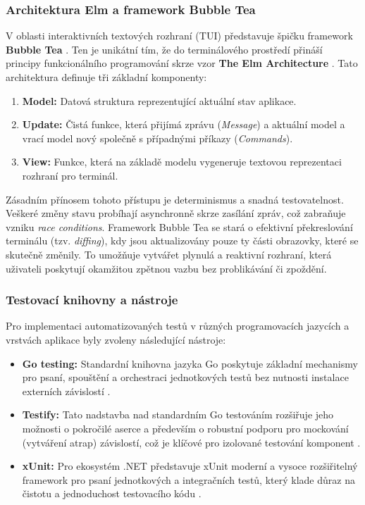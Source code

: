 \subsubsection{Architektura Elm a framework Bubble Tea}
\label{sec:elm_bubbletea}
V oblasti interaktivních textových rozhraní (TUI) představuje špičku framework \textbf{Bubble Tea} \cite{bubble_tea_intro}. Ten je unikátní tím, že do terminálového prostředí přináší principy funkcionálního programování skrze vzor \textbf{The Elm Architecture} \cite{bubble_tea_elm}. Tato architektura definuje tři základní komponenty:
\begin{enumerate}
    \item \textbf{Model:} Datová struktura reprezentující aktuální stav aplikace.
    \item \textbf{Update:} Čistá funkce, která přijímá zprávu (\textit{Message}) a aktuální model a vrací model nový společně s případnými příkazy (\textit{Commands}).
    \item \textbf{View:} Funkce, která na základě modelu vygeneruje textovou reprezentaci rozhraní pro terminál.
\end{enumerate}
Zásadním přínosem tohoto přístupu je determinismus a snadná testovatelnost. Veškeré změny stavu probíhají asynchronně skrze zasílání zpráv, což zabraňuje vzniku \textit{race conditions}. Framework Bubble Tea se stará o efektivní překreslování terminálu (tzv. \textit{diffing}), kdy jsou aktualizovány pouze ty části obrazovky, které se skutečně změnily. To umožňuje vytvářet plynulá a reaktivní rozhraní, která uživateli poskytují okamžitou zpětnou vazbu bez problikávání či zpoždění.


\subsubsection{Testovací knihovny a nástroje}
\label{sec:testovani_nastroje}
Pro implementaci automatizovaných testů v různých programovacích jazycích a vrstvách aplikace byly zvoleny následující nástroje:

\begin{itemize}
    \item \textbf{Go testing:} Standardní knihovna jazyka Go poskytuje základní mechanismy pro psaní, spouštění a orchestraci jednotkových testů bez nutnosti instalace externích závislostí \cite{go_testing}.
    \item \textbf{Testify:} Tato nadstavba nad standardním Go testováním rozšiřuje jeho možnosti o pokročilé aserce a především o robustní podporu pro mockování (vytváření atrap) závislostí, což je klíčové pro izolované testování komponent \cite{testify}.
    \item \textbf{xUnit:} Pro ekosystém .NET představuje xUnit moderní a vysoce rozšiřitelný framework pro psaní jednotkových a integračních testů, který klade důraz na čistotu a jednoduchost testovacího kódu \cite{xunit}.
\end{itemize}

